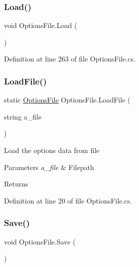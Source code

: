 \subsubsection{\texorpdfstring{Load()}{Load()}}
{\footnotesize\ttfamily void Options\+File.\+Load (\begin{DoxyParamCaption}{ }\end{DoxyParamCaption})}



Definition at line 263 of file Options\+File.\+cs.

\mbox{\label{class_options_file_ac77fcecfa3e8693e76c52411c612720c}} 
\subsubsection{\texorpdfstring{Load\+File()}{LoadFile()}}
{\footnotesize\ttfamily static \mbox{\hyperlink{class_options_file}{Options\+File}} Options\+File.\+Load\+File (\begin{DoxyParamCaption}\item[{string}]{a\+\_\+file }\end{DoxyParamCaption})\hspace{0.3cm}{\ttfamily [static]}}



Load the options data from file 


\begin{DoxyParams}{Parameters}
{\em a\+\_\+file} & Filepath\\
\hline
\end{DoxyParams}
\begin{DoxyReturn}{Returns}

\end{DoxyReturn}


Definition at line 20 of file Options\+File.\+cs.

\mbox{\label{class_options_file_aa163cc656b4a308fe79102a20dcc0fef}} 
\subsubsection{\texorpdfstring{Save()}{Save()}}
{\footnotesize\ttfamily void Options\+File.\+Save (\begin{DoxyParamCaption}{ }\end{DoxyParamCaption})}



